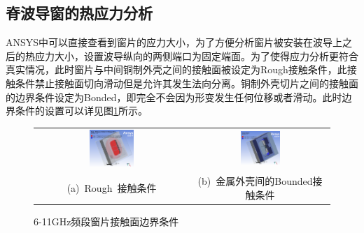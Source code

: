 \documentclass[master]{thesis-uestc}
\begin{document}
\subsection{脊波导窗的热应力分析}
ANSYS中可以直接查看到窗片的应力大小，为了方便分析窗片被安装在波导上之后的热应力大小，设置波导纵向的两侧端口为固定端面。为了使得应力分析更符合真实情况，此时窗片与中间铜制外壳之间的接触面被设定为Rough接触条件，此接触条件禁止接触面切向滑动但是允许其发生法向分离。铜制外壳切片之间的接触面的边界条件设定为Bonded，即完全不会因为形变发生任何位移或者滑动。此时边界条件的设置可以详见图\ref{fig:X频段接触面边界条件}所示。
\begin{figure}[!htb]
    \small
    \centering
    \begin{tabular}{@{\ }c@{\ }c}
        \includegraphics[width=0.3\textwidth]{pic/chapter3/金属外壳2与窗片间的接触条件.png} & 
        \hspace{5pt}
        \includegraphics[width=0.3\textwidth]{pic/chapter3/金属外壳3与2之间的接触条件.png}     \\
        \mbox{\small (a) Rough 接触条件}                                                                               & 
        \mbox{\small (b) 金属外壳间的Bounded接触条件}                                                                                  \\
    \end{tabular}
    \caption{6-11GHz频段窗片接触面边界条件}
    \label{fig:X频段接触面边界条件}
\end{figure}
\end{document}
